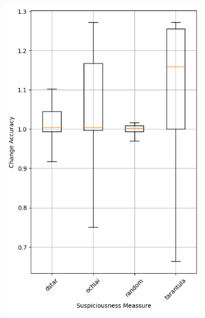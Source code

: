 \begin{figure}
    \begin{subfigure}{0.5\textwidth}
        \centering
        \includegraphics[width=0.95\textwidth]{plots/Meassure_NotTrained_accuracy.png}
    \end{subfigure}
    \begin{subfigure}{0.5\textwidth}
        \centering

\end{subfigure}
\end{figure}
